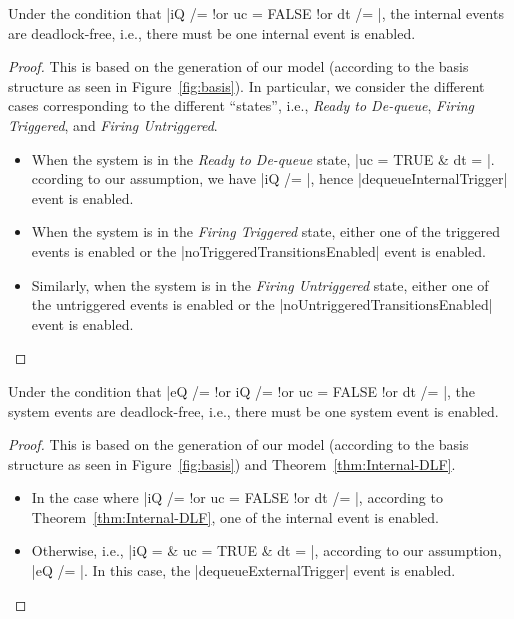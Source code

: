 \begin{theorem}
  \label{thm:Internal-DLF}
  Under the condition that %
  |iQ /= {} !or uc = FALSE !or dt /= {}|, %
  the internal events are deadlock-free, i.e., there must be
  one internal event is enabled.
\end{theorem}
\begin{proof}
  This is based on the generation of our \EventB model (according to
  the basis structure as seen in Figure~\ref{fig:basis}).  In
  particular, we consider the different cases corresponding to the
  different ``states'', i.e., \emph{Ready to De-queue}, \emph{Firing
    Triggered}, and \emph{Firing Untriggered}.
  \begin{itemize}
  \item When the system is in the \emph{Ready to De-queue} state, %
    |uc = TRUE & dt = {}|.  %
    ccording to our assumption, we have |iQ /= {}|, hence
    |dequeueInternalTrigger| event is enabled.
    
  \item When the system is in the \emph{Firing Triggered} state,
    either one of the triggered events is enabled or the
    |noTriggeredTransitionsEnabled| event is enabled.
    
  \item Similarly, when the system is in the \emph{Firing Untriggered}
      state, either one of the untriggered events is enabled or the
      |noUntriggeredTransitionsEnabled| event is enabled.  
  \end{itemize}
\end{proof}
    
\begin{corollary}
  Under the condition that %
  |eQ /= {} !or iQ /= {} !or uc = FALSE !or dt /= {}|, %
  the system events are deadlock-free, i.e., there must be
  one system event is enabled.
\end{corollary}
\begin{proof}
  This is based on the generation of our \EventB model (according to
  the basis structure as seen in Figure~\ref{fig:basis}) and
  Theorem~\ref{thm:Internal-DLF}.
  \begin{itemize}
  \item In the case where |iQ /= {} !or uc = FALSE !or dt /= {}|,
    according to Theorem~\ref{thm:Internal-DLF}, one of the internal
    event is enabled.
    
  \item Otherwise, i.e., |iQ = {} & uc = TRUE & dt = {}|, according to
    our assumption, |eQ /= {}|. In this case, the
    |dequeueExternalTrigger| event is enabled.
\end{itemize}
\end{proof}


